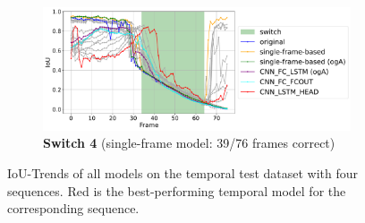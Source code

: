 \begin{figure}[H]

    \begin{subfigure}[t]{0.8\textwidth}
        \centering
        \includegraphics[width=\textwidth]{PICs/experiments/temporalModels/plot_ious_sequence_1_updated_v2.pdf}
        \caption{\textbf{Switch 4} (single-frame model: 39/76 frames correct)}
        \label{fig:IoUTrends_switch_1}
    \end{subfigure}

    \caption{\ac{IoU}-Trends of all models on the temporal test dataset with four sequences. Red is the best-performing temporal model for the corresponding sequence.}
    \label{fig:IoUTrends}
\end{figure}


\begin{table}[H]
    \centering
    \caption{Temporal Models Results Switches}
    \label{tab:temporalModelsResultsIoUsSummary}
\end{table}

